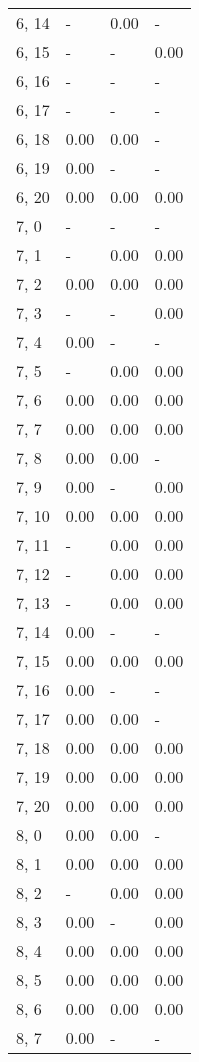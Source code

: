 \begin{table}
\begin{tabular}{llll}
6, 14  &     - &  0.00 &     - \\
6, 15  &     - &     - &  0.00 \\
6, 16  &     - &     - &     - \\
6, 17  &     - &     - &     - \\
6, 18  &  0.00 &  0.00 &     - \\
6, 19  &  0.00 &     - &     - \\
6, 20  &  0.00 &  0.00 &  0.00 \\
7, 0   &     - &     - &     - \\
7, 1   &     - &  0.00 &  0.00 \\
7, 2   &  0.00 &  0.00 &  0.00 \\
7, 3   &     - &     - &  0.00 \\
7, 4   &  0.00 &     - &     - \\
7, 5   &     - &  0.00 &  0.00 \\
7, 6   &  0.00 &  0.00 &  0.00 \\
7, 7   &  0.00 &  0.00 &  0.00 \\
7, 8   &  0.00 &  0.00 &     - \\
7, 9   &  0.00 &     - &  0.00 \\
7, 10  &  0.00 &  0.00 &  0.00 \\
7, 11  &     - &  0.00 &  0.00 \\
7, 12  &     - &  0.00 &  0.00 \\
7, 13  &     - &  0.00 &  0.00 \\
7, 14  &  0.00 &     - &     - \\
7, 15  &  0.00 &  0.00 &  0.00 \\
7, 16  &  0.00 &     - &     - \\
7, 17  &  0.00 &  0.00 &     - \\
7, 18  &  0.00 &  0.00 &  0.00 \\
7, 19  &  0.00 &  0.00 &  0.00 \\
7, 20  &  0.00 &  0.00 &  0.00 \\
8, 0   &  0.00 &  0.00 &     - \\
8, 1   &  0.00 &  0.00 &  0.00 \\
8, 2   &     - &  0.00 &  0.00 \\
8, 3   &  0.00 &     - &  0.00 \\
8, 4   &  0.00 &  0.00 &  0.00 \\
8, 5   &  0.00 &  0.00 &  0.00 \\
8, 6   &  0.00 &  0.00 &  0.00 \\
8, 7   &  0.00 &     - &     - \\

\end{tabular}
\end{table}
